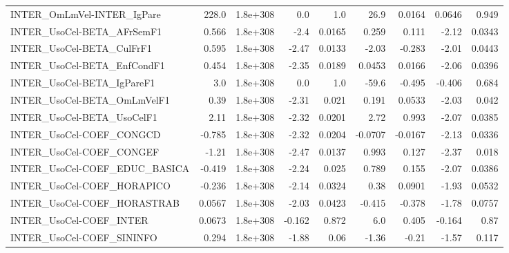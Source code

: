 \begin{tabular}{lrrrrrrrr}
INTER\_OmLmVel-INTER\_IgPare            &       228.0 &     1.8e+308 &     0.0 &      1.0 &       26.9 &      0.0164 &       0.0646 &         0.949 \\
INTER\_UsoCel-BETA\_AFrSemF1            &       0.566 &     1.8e+308 &    -2.4 &   0.0165 &      0.259 &       0.111 &        -2.12 &        0.0343 \\
INTER\_UsoCel-BETA\_CulFrF1             &       0.595 &     1.8e+308 &   -2.47 &   0.0133 &      -2.03 &      -0.283 &        -2.01 &        0.0443 \\
INTER\_UsoCel-BETA\_EnfCondF1           &       0.454 &     1.8e+308 &   -2.35 &   0.0189 &     0.0453 &      0.0166 &        -2.06 &        0.0396 \\
INTER\_UsoCel-BETA\_IgPareF1            &         3.0 &     1.8e+308 &     0.0 &      1.0 &      -59.6 &      -0.495 &       -0.406 &         0.684 \\
INTER\_UsoCel-BETA\_OmLmVelF1           &        0.39 &     1.8e+308 &   -2.31 &    0.021 &      0.191 &      0.0533 &        -2.03 &         0.042 \\
INTER\_UsoCel-BETA\_UsoCelF1            &        2.11 &     1.8e+308 &   -2.32 &   0.0201 &       2.72 &       0.993 &        -2.07 &        0.0385 \\
INTER\_UsoCel-COEF\_CONGCD              &      -0.785 &     1.8e+308 &   -2.32 &   0.0204 &    -0.0707 &     -0.0167 &        -2.13 &        0.0336 \\
INTER\_UsoCel-COEF\_CONGEF              &       -1.21 &     1.8e+308 &   -2.47 &   0.0137 &      0.993 &       0.127 &        -2.37 &         0.018 \\
INTER\_UsoCel-COEF\_EDUC\_BASICA         &      -0.419 &     1.8e+308 &   -2.24 &    0.025 &      0.789 &       0.155 &        -2.07 &        0.0386 \\
INTER\_UsoCel-COEF\_HORAPICO            &      -0.236 &     1.8e+308 &   -2.14 &   0.0324 &       0.38 &      0.0901 &        -1.93 &        0.0532 \\
INTER\_UsoCel-COEF\_HORASTRAB           &      0.0567 &     1.8e+308 &   -2.03 &   0.0423 &     -0.415 &      -0.378 &        -1.78 &        0.0757 \\
INTER\_UsoCel-COEF\_INTER               &      0.0673 &     1.8e+308 &  -0.162 &    0.872 &        6.0 &       0.405 &       -0.164 &          0.87 \\
INTER\_UsoCel-COEF\_SININFO             &       0.294 &     1.8e+308 &   -1.88 &     0.06 &      -1.36 &       -0.21 &        -1.57 &         0.117 \\

\end{tabular}
